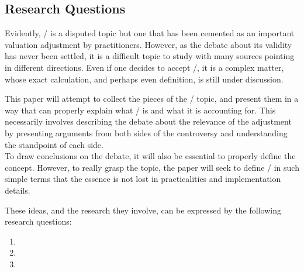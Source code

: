 \documentclass[main.tex]{subfiles}
\begin{document}
    \subsection{Research Questions}
        
    Evidently, \FVA/ is a disputed topic 
    but one that has been cemented as an important valuation adjustment by practitioners.
    However, as the debate about its validity has never been settled,
    it is a difficult topic to study with many sources pointing in different directions.
    Even if one decides to accept \FVA/, it is a complex matter,
    whose exact calculation, and perhaps even definition, is still under discussion.

    This paper will attempt to collect the pieces of the \FVA/ topic,
    and present them in a way that can properly explain what \FVA/ is and what it is accounting for.
    This necessarily involves describing the debate about the relevance of the adjustment
    by presenting arguments from both sides of the controversy 
    and understanding the standpoint of each side.
    \\
    To draw conclusions on the debate, it will also be essential to properly define the concept.
    However, to really grasp the topic, the paper will seek to define \FVA/ in such simple terms 
    that the essence is not lost in practicalities and implementation details.

    These ideas, and the research they involve, can be expressed by the following research questions:
    \begin{enumerate}
        \item \researchQuestionFundingCosts
        \item \researchQuestionFvaDebate
        \item \researchQuestionFvaImplications
    \end{enumerate}
\end{document}
